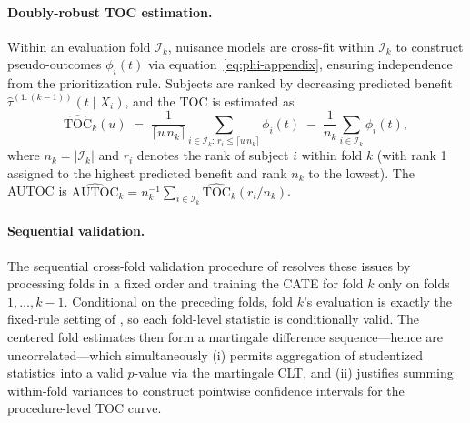 \documentclass{article}
\newcommand{\hattau}{\hat{\tau}}
\begin{document}
\paragraph{Doubly-robust TOC estimation.}
Within an evaluation fold $\mathcal{I}_k$, nuisance models are cross-fit within $\mathcal{I}_k$ to construct pseudo-outcomes $\phi_i(t)$ via equation~\eqref{eq:phi-appendix}, ensuring independence from the prioritization rule.
Subjects are ranked by decreasing predicted benefit $\hattau^{(1:(k{-}1))}(t \mid X_i)$, and the TOC is estimated as
\begin{equation}\label{eq:toc-dr-estimator}
\widehat{\mathrm{TOC}}_k(u) \;=\; \frac{1}{\lceil u\, n_k \rceil}\!\sum_{i \in \mathcal{I}_k:\, r_i \leq \lceil u\, n_k\rceil} \!\phi_i(t) \;-\; \frac{1}{n_k}\sum_{i \in \mathcal{I}_k} \phi_i(t),
\end{equation}
where $n_k = |\mathcal{I}_k|$ and $r_i$ denotes the rank of subject $i$ within fold $k$ (with rank 1 assigned to the highest predicted benefit and rank $n_k$ to the lowest).
The AUTOC is $\widehat{\mathrm{AUTOC}}_k = n_k^{-1}\sum_{i \in \mathcal{I}_k} \widehat{\mathrm{TOC}}_k(r_i / n_k)$.

\paragraph{Sequential validation.}
The sequential cross-fold validation procedure of \citet{wager2024sequential} resolves these issues by processing folds in a fixed order and training the CATE for fold $k$ only on folds $1, \ldots, k{-}1$. Conditional on the preceding folds, fold $k$'s evaluation is exactly the fixed-rule setting of \citet{yadlowsky2025rate}, so each fold-level statistic is conditionally valid. The centered fold estimates then form a martingale difference sequence---hence are uncorrelated---which simultaneously (i) permits aggregation of studentized statistics into a valid $p$-value via the martingale CLT, and (ii) justifies summing within-fold variances to construct pointwise confidence intervals for the procedure-level TOC curve.
\end{document}
